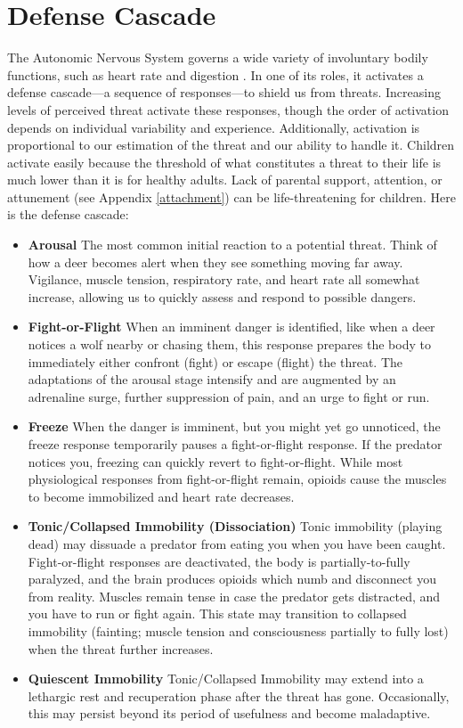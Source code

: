 \documentclass[12pt,letterpaper]{book}
\begin{document}
\section{Defense Cascade}
\label{sec:defensecascade}
The Autonomic Nervous System governs a wide variety of involuntary bodily functions, such as heart rate and digestion \cite{kozlowskaDefenseCascade}. In one of its roles, it activates a defense cascade—a sequence of responses—to shield us from threats. Increasing levels of perceived threat activate these responses, though the order of activation depends on individual variability and experience. Additionally, activation is proportional to our estimation of the threat and our ability to handle it. Children activate easily because the threshold of what constitutes a threat to their life is much lower than it is for healthy adults. Lack of parental support, attention, or attunement (see Appendix \ref{attachment}) can be life-threatening for children. Here is the defense cascade:
\begin{itemize}
    \item \textbf{Arousal} The most common initial reaction to a potential threat. Think of how a deer becomes alert when they see something moving far away. Vigilance, muscle tension, respiratory rate, and heart rate all somewhat increase, allowing us to quickly assess and respond to possible dangers.
    \item \textbf{Fight-or-Flight} When an imminent danger is identified, like when a deer notices a wolf nearby or chasing them, this response prepares the body to immediately either confront (fight) or escape (flight) the threat. The adaptations of the arousal stage intensify and are augmented by an adrenaline surge, further suppression of pain, and an urge to fight or run.
    \item \textbf{Freeze} When the danger is imminent, but you might yet go unnoticed, the freeze response temporarily pauses a fight-or-flight response. If the predator notices you, freezing can quickly revert to fight-or-flight. While most physiological responses from fight-or-flight remain, opioids cause the muscles to become immobilized and heart rate decreases.
    \item \textbf{Tonic/Collapsed Immobility (Dissociation)} Tonic immobility (playing dead) may dissuade a predator from eating you when you have been caught. Fight-or-flight responses are deactivated, the body is partially-to-fully paralyzed, and the brain produces opioids which numb and disconnect you from reality. Muscles remain tense in case the predator gets distracted, and you have to run or fight again. This state may transition to collapsed immobility (fainting; muscle tension and consciousness partially to fully lost) when the threat further increases.
    \item \textbf{Quiescent Immobility} Tonic/Collapsed Immobility may extend into a lethargic rest and recuperation phase after the threat has gone. Occasionally, this may persist beyond its period of usefulness and become maladaptive.
\end{itemize}
\end{document}
